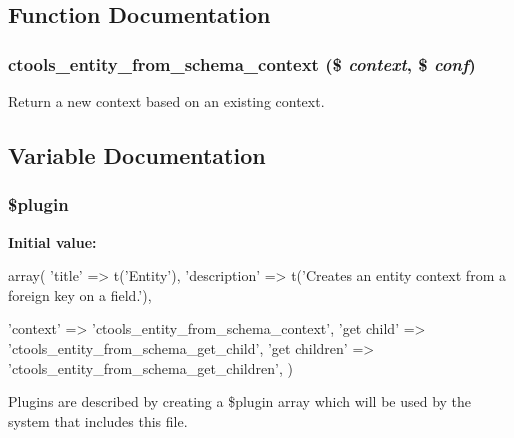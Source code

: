 \subsection{Function Documentation}
\hypertarget{entity__from__schema_8inc_a04ba5637f53804c2f3441f5728ad5713}{
\subsubsection[{ctools\_\-entity\_\-from\_\-schema\_\-context}]{\setlength{\rightskip}{0pt plus 5cm}ctools\_\-entity\_\-from\_\-schema\_\-context (\$ {\em context}, \/  \$ {\em conf})}}
\label{entity__from__schema_8inc_a04ba5637f53804c2f3441f5728ad5713}
Return a new context based on an existing context. 

\subsection{Variable Documentation}
\hypertarget{entity__from__schema_8inc_ada8a7130088351710bb02ed622d6bf65}{
\subsubsection[{\$plugin}]{\setlength{\rightskip}{0pt plus 5cm}\$plugin}}
\label{entity__from__schema_8inc_ada8a7130088351710bb02ed622d6bf65}
{\bfseries Initial value:}
\begin{DoxyCode}
 array(
  'title' => t('Entity'),
  'description' => t('Creates an entity context from a foreign key on a field.'),
      
  'context' => 'ctools_entity_from_schema_context',
  'get child' => 'ctools_entity_from_schema_get_child',
  'get children' => 'ctools_entity_from_schema_get_children',
)
\end{DoxyCode}
Plugins are described by creating a \$plugin array which will be used by the system that includes this file. 